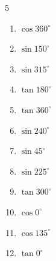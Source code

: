 \begin{multicols}{5}
\begin{enumerate}

  \item $\displaystyle \cos{360^\circ}$

        \phantom{$\displaystyle =1$}

  \item $\displaystyle \sin{150^\circ}$


  \item $\displaystyle \sin{315^\circ}$


\columnbreak %

\resetques

  \item $\displaystyle \tan{180^\circ}$

        \phantom{$\displaystyle =0$}

  \item $\displaystyle \tan{360^\circ}$

        \phantom{$\displaystyle =0$}

  \item $\displaystyle \sin{240^\circ}$


  \item $\displaystyle \sin{45^\circ}$


  \item $\displaystyle \sin{225^\circ}$


  \item $\displaystyle \tan{300^\circ}$


  \item $\displaystyle \cos{0^\circ}$

        \phantom{$\displaystyle =1$}

  \item $\displaystyle \cos{135^\circ}$


  \item $\displaystyle \tan{0^\circ}$


\end{enumerate}
\end{multicols}
